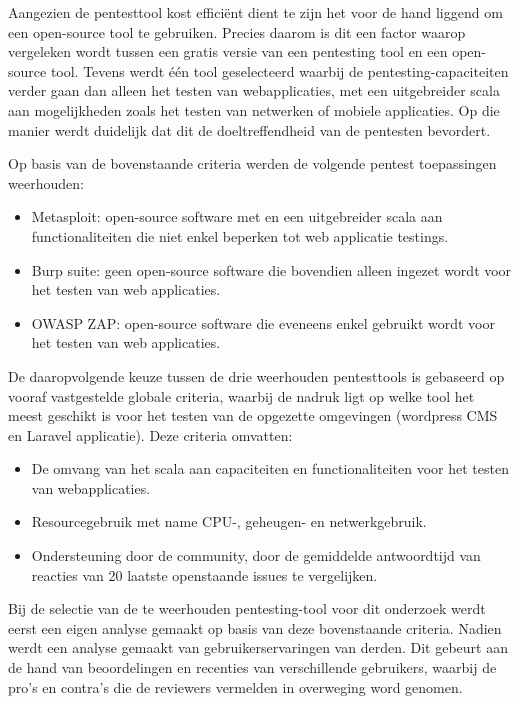 Aangezien de pentesttool kost efficiënt dient te zijn het voor de hand liggend om een open-source tool te gebruiken. Precies daarom 
is dit een factor waarop vergeleken wordt tussen een gratis versie van een pentesting tool en een open-source tool. 
Tevens werdt één tool geselecteerd waarbij de pentesting-capaciteiten verder gaan dan alleen het testen van webapplicaties, met een 
uitgebreider scala aan mogelijkheden zoals het testen van netwerken of mobiele applicaties. Op die manier werdt duidelijk dat dit 
de doeltreffendheid van de pentesten bevordert.

Op basis van de bovenstaande criteria werden de volgende pentest toepassingen weerhouden:
\begin{itemize}
    \item Metasploit: open-source software met en een uitgebreider scala aan functionaliteiten die niet enkel beperken tot web applicatie testings.
    \item Burp suite: geen open-source software die bovendien alleen ingezet wordt voor het testen van web applicaties.
    \item OWASP ZAP: open-source software die eveneens enkel gebruikt wordt voor het testen van web applicaties.
\end{itemize}


De daaropvolgende keuze tussen de drie weerhouden pentesttools is gebaseerd op vooraf vastgestelde globale criteria, waarbij de nadruk ligt op welke tool het meest 
geschikt is voor het testen van de opgezette omgevingen (wordpress CMS en Laravel applicatie). Deze criteria omvatten:
\begin{itemize}
    \item De omvang van het scala aan capaciteiten en functionaliteiten voor het testen van webapplicaties.
    \item Resourcegebruik met name CPU-, geheugen- en netwerkgebruik.
    \item Ondersteuning door de community, door de gemiddelde antwoordtijd van reacties van 20 laatste openstaande issues te vergelijken.
\end{itemize}

Bij de selectie van de te weerhouden pentesting-tool voor dit onderzoek werdt eerst een eigen analyse gemaakt op basis van deze bovenstaande criteria. 
Nadien werdt een analyse gemaakt van gebruikerservaringen van derden. Dit gebeurt aan de hand van beoordelingen en recenties van 
verschillende gebruikers, waarbij de pro's en contra's die de reviewers vermelden in overweging word genomen. 


